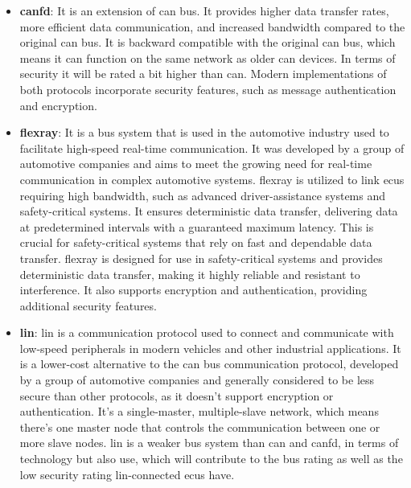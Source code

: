 \begin{itemize}
    \item \textbf{\acrlong{canfd}}: It is an extension of \acrshort{can} bus.
    It provides higher data transfer rates, more efficient data communication, and increased bandwidth compared to the original \acrshort{can} bus.
    It is backward compatible with the original \acrshort{can} bus, which means it can function on the same network as older \acrshort{can} devices.
    In terms of security it will be rated a bit higher than \acrshort{can}.
    Modern implementations of both protocols incorporate security features, such as message authentication and encryption.
    
    \item \textbf{\acrshort{flexray}}: It is a bus system that is used in the automotive industry used to facilitate high-speed real-time communication.
    It was developed by a group of automotive companies and aims to meet the growing need for real-time communication in complex automotive systems.
    \acrshort{flexray} is utilized to link \acrshort{ecu}s requiring high bandwidth, such as advanced driver-assistance systems and safety-critical systems. 
    It ensures deterministic data transfer, delivering data at predetermined intervals with a guaranteed maximum latency. 
    This is crucial for safety-critical systems that rely on fast and dependable data transfer.
    \acrshort{flexray} is designed for use in safety-critical systems and provides deterministic data transfer, making it highly reliable and resistant to interference. 
    It also supports encryption and authentication, providing additional security features.

    \item \textbf{\acrlong{lin}}: \acrshort{lin} is a communication protocol used to connect and communicate with low-speed peripherals in modern vehicles and other industrial applications. 
    It is a lower-cost alternative to the \acrshort{can} bus communication protocol, developed by a group of automotive companies 
    and generally considered to be less secure than other protocols, as it doesn't support encryption or authentication.
    It's a single-master, multiple-slave network, which means there's one master node that controls the communication between one or more slave nodes.
    \acrshort{lin} is a weaker bus system than \acrshort{can} and \acrshort{canfd}, in terms of technology but also use, which will contribute to the bus rating 
    as well as the low security rating \acrshort{lin}-connected \acrshort{ecu}s have.
    

\end{itemize}
